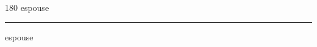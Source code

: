
\begin{frame}
\begin{center}
\begin{turn}{180}
{\fontsize{2.5cm}{1em}\selectfont espouse}
\end{turn}
\vspace{1em}\par  
\hrule
\vspace{1em}\par  
{\fontsize{2.5cm}{1em}\selectfont espouse}
\end{center}
\end{frame}
